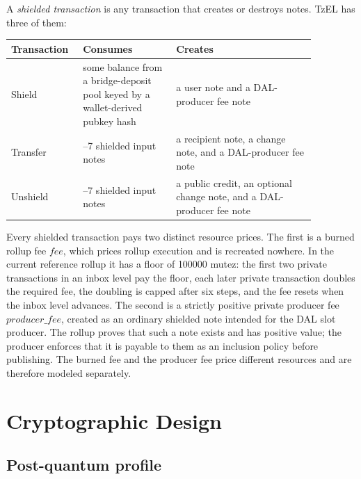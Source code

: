 \documentclass[11pt]{article}
\newcommand{\TzEL}{TzEL}
\begin{document}
A \emph{shielded transaction} is any transaction that creates or destroys notes.
\TzEL{} has three of them:

\begin{center}
\begin{tabular}{>{\raggedright\arraybackslash}p{0.17\linewidth} >{\raggedright\arraybackslash}p{0.28\linewidth} >{\raggedright\arraybackslash}p{0.42\linewidth}}
\toprule
Transaction & Consumes & Creates \\
\midrule
Shield & some balance from a bridge-deposit pool keyed by a wallet-derived pubkey hash & a user note and a DAL-producer fee note \\
Transfer & 1--7 shielded input notes & a recipient note, a change note, and a DAL-producer fee note \\
Unshield & 1--7 shielded input notes & a public credit, an optional change note, and a DAL-producer fee note \\
\bottomrule
\end{tabular}
\end{center}

Every shielded transaction pays two distinct resource prices. The first is a
burned rollup fee \(fee\), which prices rollup execution and is recreated
nowhere. In the current reference rollup it has a floor of 100000 mutez: the
first two private transactions in an inbox level pay the floor, each later
private transaction doubles the required fee, the doubling is capped after six
steps, and the fee resets when the inbox level advances. The second is a
strictly positive private producer fee \(producer\_fee\), created as an
ordinary shielded note intended for the DAL slot producer. The rollup proves
that such a note exists and has positive value; the producer enforces that it is
payable to them as an inclusion policy before publishing. The burned fee and the
producer fee price different resources and are therefore modeled separately.

\section{Cryptographic Design}

\subsection{Post-quantum profile}
\end{document}
